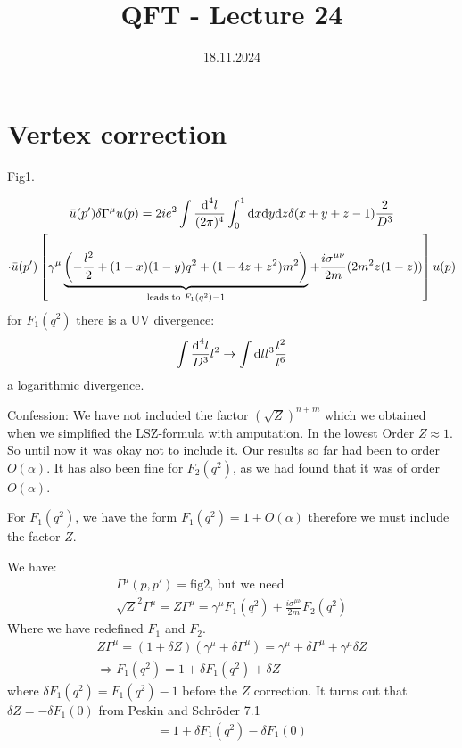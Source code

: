\documentclass[]{scrartcl}
\title{QFT - Lecture 24}
\author{}
\date{18.11.2024}
\begin{document}
\maketitle
\newpage
\tableofcontents
\newpage

\section{Vertex correction} 

Fig1.

\begin{gather}
	\bar u (p') \delta\Gamma^\mu u(p) = 2ie^2 \int \frac{\text d^4l}{(2\pi)^4}\int_0^1 \text dx\text dy\text dz \delta(x+y+z-1) \frac{2}{D^3}\\
	\cdot \bar u(p') \left[\gamma^\mu \underbrace{\left(-\frac{l^2}{2} + (1-x)(1-y)q^2 + (1-4z+z^2) m^2\right)}_{\text{leads to } F_1(q^2)-1} + \frac{i\sigma^{\mu\nu}}{2m}(2m^2z(1-z))\right]u(p)
\end{gather}
for $F_1(q^2)$ there is a UV divergence:
\begin{gather}
	\int \frac{\text d^4l}{D^3}l^2 \rightarrow \int \text dl l^3 \frac{l^2}{l^6}
\end{gather}
a logarithmic divergence.

Confession: We have not included the factor $(\sqrt{Z})^{n+m}$ which we obtained when we simplified the LSZ-formula with amputation. In the lowest Order $Z\approx 1$. So until now it was okay not to include it. Our results so far had been to order $O(\alpha)$. It has also been fine for $F_2(q^2)$, as we had found that it was of order $O(\alpha)$.

For $F_1(q^2)$, we have the form $F_1(q^2) = 1 + O(\alpha)$ therefore we must include the factor $Z$.

We have:
\begin{gather}
	\Gamma^\mu(p,p') = \text{fig2, but we need}\\
	\sqrt{Z}^2 \Gamma^\mu = Z\Gamma^\mu = \gamma^\mu F_1(q^2) + \frac{i\sigma^{\mu\nu}}{2m}F_2(q^2)
\end{gather}
Where we have redefined $F_1$ and $F_2$.
\begin{gather}
	Z\Gamma^\mu = (1+\delta Z)(\gamma^\mu + \delta \Gamma^\mu) = \gamma^\mu + \delta\Gamma^\mu + \gamma^\mu\delta Z\\
	\Rightarrow F_1(q^2) = 1 + \delta F_1(q^2) + \delta Z
\end{gather}
where $\delta F_1(q^2) = F_1(q^2) -1$ before the $Z$ correction. It turns out that $\delta Z = -\delta F_1(0)$ from Peskin and Schröder 7.1
\begin{gather}
	= 1 + \delta F_1(q^2) - \delta F_1(0)
\end{gather}
\end{document}
